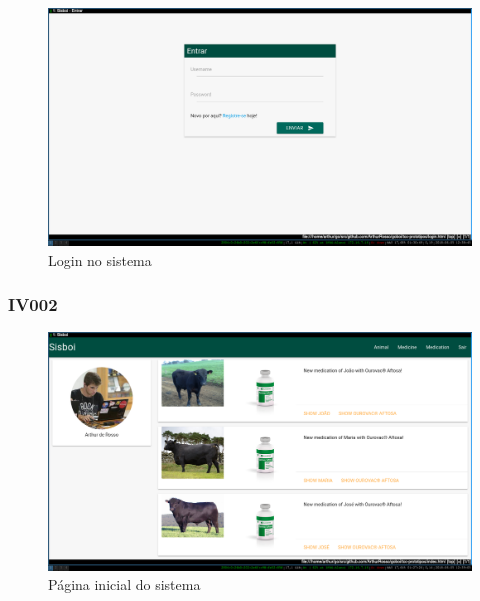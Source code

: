 \documentclass[12pt]{article}
\begin{document}
\begin{titlepage}
	\begin{figure}[!h]
		\begin{center}
			\caption{Login no sistema}
			\includegraphics[width=13cm]{img/prototipos/login.png}


		\end{center}
	\end{figure}


	\subsubsection{IV002}

	\begin{figure}[!h]
		\begin{center}
			\caption{Página inicial do sistema}
			\includegraphics[width=13cm]{img/prototipos/index.png}


		\end{center}
	\end{figure}

	\newpage


\end{titlepage}
\end{document}

